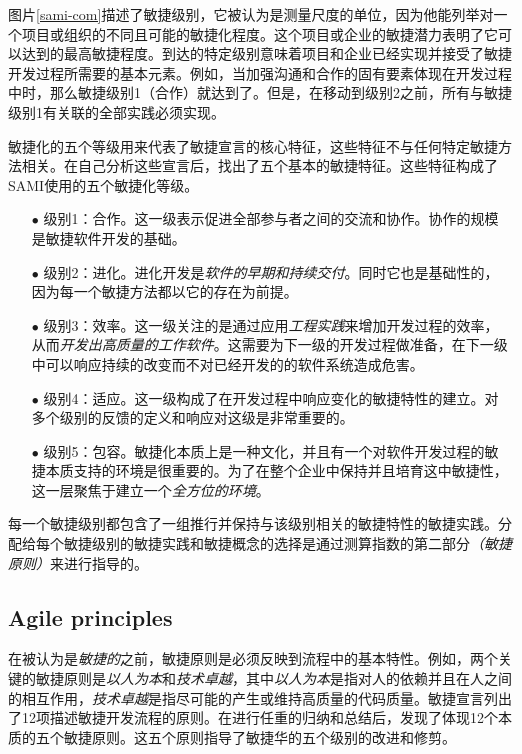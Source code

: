 \documentclass[twocolumn]{svjour3}[]
\begin{document}
图片\ref{sami-com}描述了敏捷级别，它被认为是测量尺度的单位，因为他能列举对一个项目或组织的不同且可能的敏捷化程度。这个项目或企业的敏捷潜力表明了它可以达到的最高敏捷程度。到达的特定级别意味着项目和企业已经实现并接受了敏捷开发过程所需要的基本元素。例如，当加强沟通和合作的固有要素体现在开发过程中时，那么敏捷级别1（合作）就达到了。但是，在移动到级别2之前，所有与敏捷级别1有关联的全部实践必须实现。

敏捷化的五个等级用来代表了敏捷宣言的核心特征\cite{agilemanifestoo2001agile}，这些特征不与任何特定敏捷方法相关。在自己分析这些宣言后，找出了五个基本的敏捷特征。这些特征构成了SAMI使用的五个敏捷化等级。

\begin{itemize}
    \item[$\bullet$] 级别1：合作。这一级表示促进全部参与者之间的交流和协作。协作的规模是敏捷软件开发的基础\cite{cockburn2001agile,cockburn2001agilesoftware,tabaka2006collaboration}。
    \item[$\bullet$] 级别2：进化。进化开发是\textit{软件的早期和持续交付}。同时它也是基础性的，因为每一个敏捷方法都以它的存在为前提\cite{larman2004agile}。
    \item[$\bullet$] 级别3：效率。这一级关注的是通过应用\textit{工程实践}来增加开发过程的效率，从而\textit{开发出高质量的工作软件}。这需要为下一级的开发过程做准备，在下一级中可以响应持续的改变而不对已经开发的的软件系统造成危害\cite{cockburn2001agilesoftware,hunt2006agile}。
    \item[$\bullet$] 级别4：适应。这一级构成了在开发过程中响应变化的敏捷特性的建立。对多个级别的反馈的定义和响应对这级是非常重要的\cite{highsmith2002agile}。
    \item[$\bullet$] 级别5：包容。敏捷化本质上是一种文化，并且有一个对软件开发过程的敏捷本质支持的环境是很重要的。为了在整个企业中保持并且培育这中敏捷性，这一层聚焦于建立一个\textit{全方位的环境}。
\end{itemize}

每一个敏捷级别都包含了一组推行并保持与该级别相关的敏捷特性的敏捷实践。分配给每个敏捷级别的敏捷实践和敏捷概念的选择是通过测算指数的第二部分\textit{（敏捷原则）}来进行指导的。

\subsection{Agile principles}
\label{ap}

在被认为是\textit{敏捷的}之前，敏捷原则是必须反映到流程中的基本特性。例如，两个关键的敏捷原则是\textit{以人为本}和\textit{技术卓越}，其中\textit{以人为本}是指对人的依赖并且在人之间的相互作用，\textit{技术卓越}是指尽可能的产生或维持高质量的代码质量。敏捷宣言列出了12项描述敏捷开发流程的原则\cite{cockburn2001agile}。在进行任重的归纳和总结后，发现了体现12个本质的五个敏捷原则。这五个原则指导了敏捷华的五个级别的改进和修剪。
\end{document}
